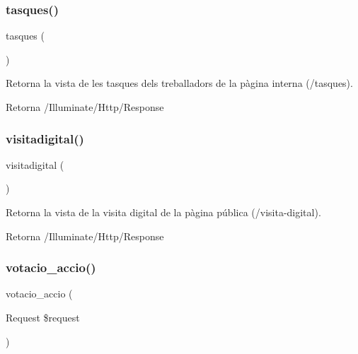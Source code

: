 \subsubsection{\texorpdfstring{tasques()}{tasques()}}
{\footnotesize\ttfamily tasques (\begin{DoxyParamCaption}{ }\end{DoxyParamCaption})}

Retorna la vista de les tasques dels treballadors de la pàgina interna (/tasques).

\begin{DoxyReturn}{Retorna}
/\+Illuminate/\+Http/\+Response 
\end{DoxyReturn}
\mbox{\label{class_app_1_1_http_1_1_controllers_1_1_home_controller_a096e2d1a19bebdd25e74bab5719da650}} 
\subsubsection{\texorpdfstring{visitadigital()}{visitadigital()}}
{\footnotesize\ttfamily visitadigital (\begin{DoxyParamCaption}{ }\end{DoxyParamCaption})}

Retorna la vista de la visita digital de la pàgina pública (/visita-\/digital).

\begin{DoxyReturn}{Retorna}
/\+Illuminate/\+Http/\+Response 
\end{DoxyReturn}
\mbox{\label{class_app_1_1_http_1_1_controllers_1_1_home_controller_a1e27f7c6bccc8ab6836307ecc7bd0a64}} 
\subsubsection{\texorpdfstring{votacio\+\_\+accio()}{votacio\_accio()}}
{\footnotesize\ttfamily votacio\+\_\+accio (\begin{DoxyParamCaption}\item[{Request}]{\$request }\end{DoxyParamCaption})}

